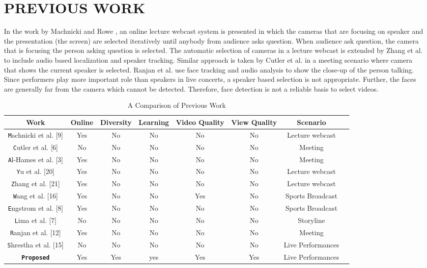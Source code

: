 \documentclass{sig-alternate}
\begin{document}
\section{PREVIOUS WORK}
 In the work by Machnicki and Rowe \cite{9}, an online lecture webcast system is presented in which the cameras that are focusing on speaker and the presentation (the screen) are selected iteratively until anybody from audience asks question. When audience ask question, the camera that is focusing the person asking question is selected. The automatic selection of cameras in a lecture webcast is extended by Zhang et al. \cite{21} to include audio based localization and speaker tracking. Similar approach is taken by Cutler et al. \cite{6} in a meeting scenario where camera that shows the current speaker is selected. Ranjan et al. \cite{12} use face tracking and audio analysis to show the close-up of the person talking. Since performers play more important role than speakers in live concerts, a speaker based selection is not appropriate. Further, the faces are generally far from the camera which cannot be detected. Therefore, face detection is not a reliable basis to select videos.

\begin{table}
\centering
\caption{A Comparison of Previous Work}
\begin{tabular}{|c|c|c|c|c|c|c|c|} \hline
Work&Online&Diversity&Learning&Video Quality&View Quality&Scenario\\ \hline
\texttt Machnicki et al. [9]&Yes&No&No&No&No&Lecture webcast  \\ \hline 
\texttt Cutler et al. [6]&No&No&No&No&No&Meeting  \\ \hline 
\texttt Al-Hames et al. [3]&Yes&No&No&No&No&Meeting  \\ \hline 
\texttt Yu et al. [20]&Yes&No&No&No&No&Lecture webcast  \\ \hline 
\texttt Zhang et al. [21]&Yes&No&No&No&No&Lecture webcast  \\ \hline 
\texttt Wang et al. [16]&Yes&No&No&Yes&No&Sports Broadcast  \\ \hline 
\texttt Engstrom et al. [8]&Yes&No&No&No&No&Sports Broadcast  \\ \hline 
\texttt Lima et al. [7]&No&No&No&No&No&Storyline  \\ \hline 
\texttt Ranjan et al. [12]&Yes&No&No&No&No&Meeting  \\ \hline 
\texttt Shrestha et al. [15]&No&No&No&No&No&Live Performances  \\ \hline 
\texttt \textbf{Proposed}&Yes&Yes&yes&Yes&Yes&Live Performances\\ \hline
\end{tabular}
\end{table}
\end{document}

